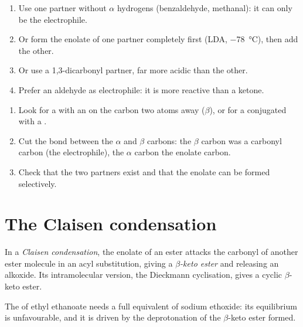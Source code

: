 \begin{method}\label{met:b2:enolates-aldol:crossed-aldol}
\begin{enumerate}
  \item Use one partner without $\alpha$ hydrogens (benzaldehyde, methanal): it can only be the
        electrophile.
  \item Or form the enolate of one partner completely first (LDA, \qty{-78}{\degreeCelsius}), then add
        the other.
  \item Or use a 1,3-dicarbonyl partner, far more acidic than the other.
  \item Prefer an aldehyde as electrophile: it is more reactive than a ketone.
\end{enumerate}
\end{method}

\begin{method}\label{met:b2:enolates-aldol:aldol-recognition}
\begin{enumerate}
  \item Look for a  with an  on the carbon two atoms away ($\beta$), or for a 
        conjugated with a .
  \item Cut the bond between the $\alpha$ and $\beta$ carbons: the $\beta$ carbon was a carbonyl carbon (the
        electrophile), the $\alpha$ carbon the enolate carbon.
  \item Check that the two partners exist and that the enolate can be formed selectively.
\end{enumerate}
\end{method}

\section{The Claisen condensation}

\begin{definition}\label{def:b2:enolates-aldol:claisen}
In a \emph{Claisen condensation}, the enolate of an ester attacks the
carbonyl of another ester molecule in an acyl substitution, giving a \emph{$\beta$-keto ester} and releasing an alkoxide. Its intramolecular version, the Dieckmann
cyclisation, gives a cyclic $\beta$-keto ester.
\end{definition}

\begin{proposition}\label{prop:b2:enolates-aldol:claisen-drive}
The  of ethyl ethanoate needs a full equivalent of sodium ethoxide: its equilibrium
is unfavourable, and it is driven by the deprotonation of the $\beta$-keto ester formed.
\end{proposition}


